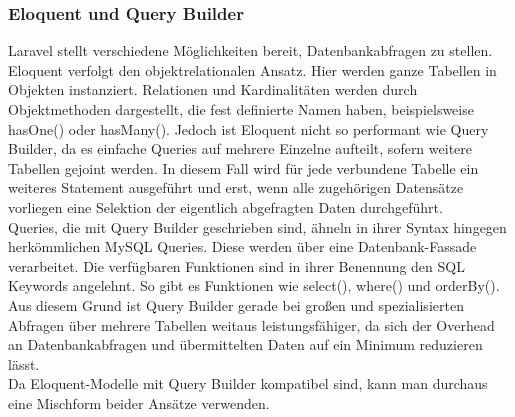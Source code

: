     \subsubsection{Eloquent und Query Builder}
    \label{sec:eloquery}
        Laravel stellt verschiedene Möglichkeiten bereit, Datenbankabfragen zu stellen. \glqq Eloquent\grqq{} verfolgt den objektrelationalen Ansatz. Hier werden ganze Tabellen in Objekten instanziert. Relationen und Kardinalitäten werden durch Objektmethoden dargestellt, die fest definierte Namen haben, beispielsweise \glqq hasOne()\grqq{} oder \glqq hasMany()\grqq{}. Jedoch ist Eloquent nicht so performant wie Query Builder, da es einfache Queries auf mehrere Einzelne aufteilt, sofern weitere Tabellen gejoint werden. In diesem Fall wird für jede verbundene Tabelle ein weiteres Statement ausgeführt und erst, wenn alle zugehörigen Datensätze vorliegen eine Selektion der eigentlich abgefragten Daten durchgeführt.\\
        Queries, die mit Query Builder geschrieben sind, ähneln in ihrer Syntax hingegen herkömmlichen MySQL Queries. Diese werden über eine Datenbank-Fassade verarbeitet. Die verfügbaren Funktionen sind in ihrer Benennung den SQL Keywords angelehnt. So gibt es Funktionen wie \glqq select()\grqq{}, \glqq where()\grqq{} und \glqq orderBy()\grqq{}.\\
        Aus diesem Grund ist Query Builder gerade bei großen und spezialisierten Abfragen über mehrere Tabellen weitaus leistungsfähiger, da sich der Overhead an Datenbankabfragen und übermittelten Daten auf ein Minimum reduzieren lässt.\\
        Da Eloquent-Modelle mit Query Builder kompatibel sind, kann man durchaus eine Mischform beider Ansätze verwenden.


\pagebreak

